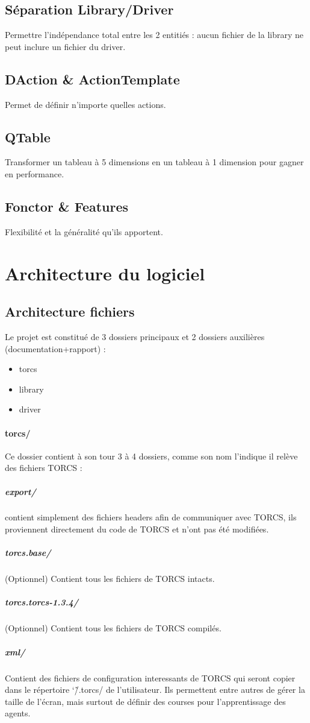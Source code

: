 \documentclass[a4paper,12pt]{article}
\begin{document}
 \subsection{Séparation Library/Driver}
  Permettre l'indépendance total entre les 2 entitiés : aucun fichier de la library ne peut inclure un fichier du driver.
  
  \subsection{DAction \& ActionTemplate} Permet de définir n'importe quelles actions.
  
  \subsection{QTable} Transformer un tableau à 5 dimensions en un tableau à 1 dimension pour gagner en performance.
  
  \subsection{Fonctor \& Features} Flexibilité et la généralité qu'ils apportent.
  
  \clearpage
  \section{Architecture du logiciel}

  \subsection{Architecture fichiers}
  
  Le projet est constitué de 3 dossiers principaux et 2 dossiers auxilières (documentation+rapport) :
  \begin{itemize}
   \item torcs
   \item library
   \item driver
  \end{itemize}
  
  \paragraph{torcs/}
  Ce dossier contient à son tour 3 à 4 dossiers, comme son nom l'indique il relève des fichiers TORCS :
  \subparagraph{export/} contient simplement des fichiers headers afin de communiquer avec TORCS, ils proviennent
  directement du code de TORCS et n'ont pas été modifiées.
  \subparagraph{torcs.base/} (Optionnel) Contient tous les fichiers de TORCS intacts.
  \subparagraph{torcs.torcs-1.3.4/} (Optionnel) Contient tous les fichiers de TORCS compilés.
  \subparagraph{xml/} Contient des fichiers de configuration interessants de TORCS qui seront copier
  dans le répertoire \char`\~/.torcs/ de l'utilisateur. Ils permettent entre autres de gérer la taille de 
  l'écran, mais surtout de définir des courses pour l'apprentissage des agents.
  
\end{document}
